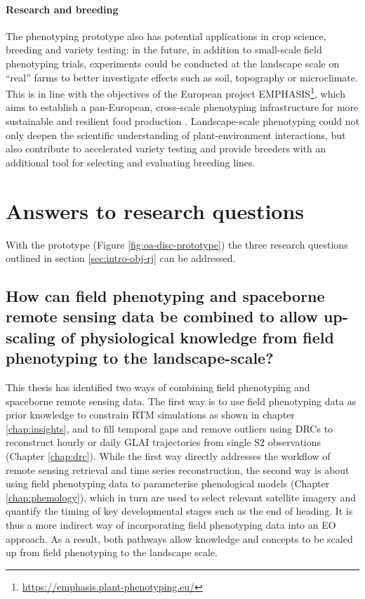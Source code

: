 \paragraph{Research and breeding}
The phenotyping prototype also has potential applications in crop science, breeding and variety testing: in the future, in addition to small-scale field phenotyping trials, experiments could be conducted at the landscape scale on ``real'' farms to better investigate effects such as soil, topography or microclimate. This is in line with the objectives of the European project EMPHASIS\footnote{\url{https://emphasis.plant-phenotyping.eu/}}, which aims to establish a pan-European, cross-scale phenotyping infrastructure for more sustainable and resilient food production \citep{pieruschka_plant_2019}. Landscape-scale phenotyping could not only deepen the scientific understanding of plant-environment interactions, but also contribute to accelerated variety testing and provide breeders with an additional tool for selecting and evaluating breeding lines.

\section{Answers to research questions}
With the prototype (Figure \ref{fig:oa-disc-prototype}) the three research questions outlined in section \ref{sec:intro-obj-rj} can be addressed.

\subsection{How can field phenotyping and spaceborne remote sensing data be combined to allow up-scaling of physiological knowledge from field phenotyping to the landscape-scale?}
This thesis has identified two ways of combining field phenotyping and spaceborne remote sensing data. The first way is to use field phenotyping data as prior knowledge to constrain \gls{RTM} simulations as shown in chapter \ref{chap:insights}, and to fill temporal gaps and remove outliers using \gls{DRC}s to reconstruct hourly or daily \gls{GLAI} trajectories from single \gls{S2} observations (Chapter \ref{chap:drc}). While the first way directly addresses the workflow of remote sensing retrieval and time series reconstruction, the second way is about using field phenotyping data to parameterise phenological models (Chapter \ref{chap:phemology}), which in turn are used to select relevant satellite imagery and quantify the timing of key developmental stages such as the end of heading. It is thus a more indirect way of incorporating field phenotyping data into an \gls{EO} approach. As a result, both pathways allow knowledge and concepts to be scaled up from field phenotyping to the landscape scale.

